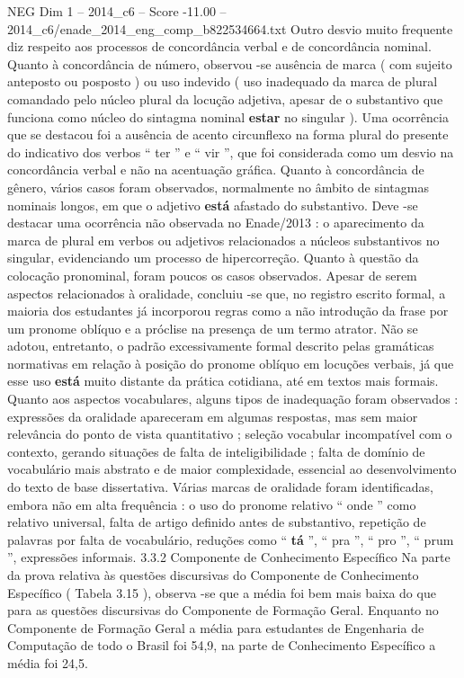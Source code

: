 \begin{textsample}{NEG Dim 1 – 2014\_c6 – Score -11.00 – 2014\_c6/enade\_2014\_eng\_comp\_b822534664.txt}
Outro desvio muito frequente diz respeito aos processos de concordância verbal e de concordância nominal.
Quanto à concordância de número, observou -se ausência de marca ( com sujeito anteposto ou posposto ) ou uso indevido ( uso inadequado da marca de plural comandado pelo núcleo plural da locução adjetiva, apesar de o substantivo que funciona como núcleo do sintagma nominal \textbf{estar} no singular ).
Uma ocorrência que se destacou foi a ausência de acento circunflexo na forma plural do presente do indicativo dos verbos “ ter ” e “ vir ”, que foi considerada como um desvio na concordância verbal e não na acentuação gráfica.
Quanto à concordância de gênero, vários casos foram observados, normalmente no âmbito de sintagmas nominais longos, em que o adjetivo \textbf{está} afastado do substantivo.
Deve -se destacar uma ocorrência não observada no Enade/2013 : o aparecimento da marca de plural em verbos ou adjetivos relacionados a núcleos substantivos no singular, evidenciando um processo de hipercorreção.
Quanto à questão da colocação pronominal, foram poucos os casos observados.
Apesar de serem aspectos relacionados à oralidade, concluiu -se que, no registro escrito formal, a maioria dos estudantes já incorporou regras como a não introdução da frase por um pronome oblíquo e a próclise na presença de um termo atrator.
Não se adotou, entretanto, o padrão excessivamente formal descrito pelas gramáticas normativas em relação à posição do pronome oblíquo em locuções verbais, já que esse uso \textbf{está} muito distante da prática cotidiana, até em textos mais formais.
Quanto aos aspectos vocabulares, alguns tipos de inadequação foram observados : expressões da oralidade apareceram em algumas respostas, mas sem maior relevância do ponto de vista quantitativo ; seleção vocabular incompatível com o contexto, gerando situações de falta de inteligibilidade ; falta de domínio de vocabulário mais abstrato e de maior complexidade, essencial ao desenvolvimento do texto de base dissertativa.
Várias marcas de oralidade foram identificadas, embora não em alta frequência : o uso do pronome relativo “ onde ” como relativo universal, falta de artigo definido antes de substantivo, repetição de palavras por falta de vocabulário, reduções como “ \textbf{tá} ”, “ pra ”, “ pro ”, “ prum ”, expressões informais. 3.3.2 Componente de Conhecimento Específico Na parte da prova relativa às questões discursivas do Componente de Conhecimento Específico ( Tabela 3.15 ), observa -se que a média foi bem mais baixa do que para as questões discursivas do Componente de Formação Geral.
Enquanto no Componente de Formação Geral a média para estudantes de Engenharia de Computação de todo o Brasil foi 54,9, na parte de Conhecimento Específico a média foi 24,5.

\end{textsample}
